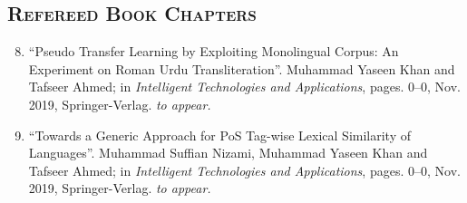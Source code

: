 \documentclass[a4paper, 10pt]{article}
\begin{document}
\subsection*{\normalfont\textsc{Refereed Book Chapters}}
\begin{enumerate}
\setcounter{enumi}{7}
\itemsep-4pt 
 \item ``Pseudo Transfer Learning by Exploiting Monolingual Corpus: An Experiment on Roman Urdu Transliteration''. Muhammad Yaseen Khan and Tafseer Ahmed; in \emph{Intelligent Technologies and Applications}, pages. 0--0, Nov. 2019, Springer-Verlag. \emph{\small to appear.}
  
   \item ``Towards a Generic Approach for PoS Tag-wise Lexical Similarity of Languages''. Muhammad Suffian Nizami, Muhammad Yaseen Khan and Tafseer Ahmed; in \emph{Intelligent Technologies and Applications}, pages. 0--0, Nov. 2019, Springer-Verlag. \emph{\small to appear.}
 \end{enumerate}
\end{document}

